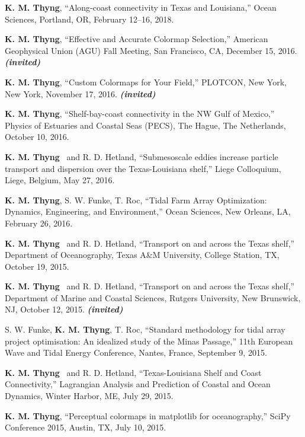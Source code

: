 \documentclass[10pt,letterpaper]{article}
\newcommand{\kmt}{\textbf{K. M. Thyng}}
\newcommand{\inv}{\textbf{\textit{(invited)}}}
\renewenvironment{itemize}{
  \begin{list}{}{
    \setlength{\leftmargin}{1.5em}
    \setlength{\itemsep}{0.25em}
    \setlength{\parskip}{0pt}
    \setlength{\parsep}{0.25em}
  }
}{
  \end{list}
}
\begin{document}
\begin{itemize}

\item \kmt, ``Along-coast connectivity in Texas and Louisiana,'' Ocean Sciences, Portland, OR, February 12--16, 2018.

\item \kmt, ``Effective and Accurate Colormap Selection,'' American Geophysical Union (AGU) Fall Meeting, San Francisco, CA, December 15, 2016. \inv

\item \kmt, ``Custom Colormaps for Your Field,'' PLOTCON, New York, New York, November 17, 2016. \inv

\item \kmt, ``Shelf-bay-coast connectivity in the NW Gulf of Mexico,'' Physics of Estuaries and Coastal Seas (PECS), The Hague, The Netherlands, October 10, 2016.

\item \kmt~ and R. D. Hetland, ``Submesoscale eddies increase particle transport and dispersion over the Texas-Louisiana shelf,'' Liege Colloquium, Liege, Belgium, May 27, 2016.

\item \kmt, S. W. Funke, T. Roc, ``Tidal Farm Array Optimization: Dynamics, Engineering, and Environment,'' Ocean Sciences, New Orleans, LA, February 26, 2016.

\item \kmt~ and R. D. Hetland, ``Transport on and across the Texas shelf,'' Department of Oceanography, Texas A\&M University, College Station, TX, October 19, 2015.

\item \kmt~ and R. D. Hetland, ``Transport on and across the Texas shelf,'' Department of Marine and Coastal Sciences, Rutgers University, New Brunswick, NJ, October 12, 2015. \inv

\item S. W. Funke, \kmt, T. Roc, ``Standard methodology for tidal array project optimisation: An idealized study of the Minas Passage,'' 11th European Wave and Tidal Energy Conference, Nantes, France, September 9, 2015.

\item \kmt~ and R. D. Hetland, ``Texas-Louisiana Shelf and Coast Connectivity,'' Lagrangian Analysis and Prediction of Coastal and Ocean Dynamics, Winter Harbor, ME, July 29, 2015.

\item \kmt, ``Perceptual colormaps in matplotlib for oceanography,'' SciPy Conference 2015, Austin, TX, July 10, 2015.


\end{itemize}
\end{document}
